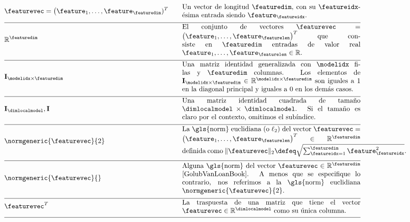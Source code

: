 \begin{align} 
	 &\featurevec=\big(\feature_{1},\ldots,\feature_{\featuredim})^{T} &\quad & \parbox{.75\textwidth}{Un vector de longitud $\featuredim$, con su 
		$\featureidx$-ésima entrada siendo $\feature_{\featureidx}$.} \nonumber \\[2mm] \hline \nonumber\\[-5mm]
	&\mathbb{R}^{\featuredim} & \quad &  \parbox{.75\textwidth}{El conjunto de vectores $\featurevec=\big(\feature_{1},\ldots,\feature_{\featurelen}\big)^{T}$ que consiste en $\featuredim$ entradas de valor real $\feature_{1},\ldots,\feature_{\featurelen} \in \mathbb{R}$.} \nonumber \\[2mm] \hline \nonumber\\[-5mm]
	&\mathbf{I}_{\modelidx \times \featuredim}  & \quad &  \parbox{.75\textwidth}{Una matriz identidad generalizada 
		con $\modelidx$ filas y $\featuredim$ columnas. Los elementos de $\mathbf{I}_{\modelidx \times \featuredim} \in \mathbb{R}^{\modelidx \times \featuredim}$ 
		son iguales a $1$ en la diagonal principal y iguales a $0$ en los demás casos. }\nonumber \\[2mm] \hline \nonumber\\[-5mm] 
	&\mathbf{I}_{\dimlocalmodel}, \mathbf{I} & \quad &  \parbox{.75\textwidth}{Una matriz identidad cuadrada 
		de tamaño $\dimlocalmodel \times \dimlocalmodel$. Si el tamaño es claro por el contexto, omitimos el subíndice.} \nonumber \\[2mm] \hline \nonumber\\[-5mm]
	&\normgeneric{\featurevec}{2}  &\quad & \parbox{.75\textwidth}{La \gls{norm} euclidiana (o $\ell_{2}$) del vector 
		$\featurevec=\big(\feature_{1},\ldots,\feature_{\featurelen}\big)^{T} \in \mathbb{R}^{\featuredim}$ definida como $ \| \featurevec \|_{2} \defeq \sqrt{\sum_{\featureidx=1}^{\featuredim} \feature_{\featureidx}^{2}}$.} \nonumber \\[2mm] \hline \nonumber\\[-5mm] 
	&\normgeneric{\featurevec}{}  & \quad &  \parbox{.75\textwidth}{Alguna \gls{norm} del vector $\featurevec \in \mathbb{R}^{\featuredim}$ \cite{GolubVanLoanBook}. A menos que se especifique lo contrario, nos referimos a la \gls{norm} euclidiana $\normgeneric{\featurevec}{2}$.} \nonumber \\[2mm] \hline \nonumber\\[-5mm]
	&\featurevec^{T} &\quad & \parbox{.75\textwidth}{La traspuesta de una matriz que tiene el vector 
		$\featurevec \in \mathbb{R}^{\dimlocalmodel}$ como su única columna.} \nonumber \\[2mm] \hline \nonumber\\[-5mm]

\end{align}
